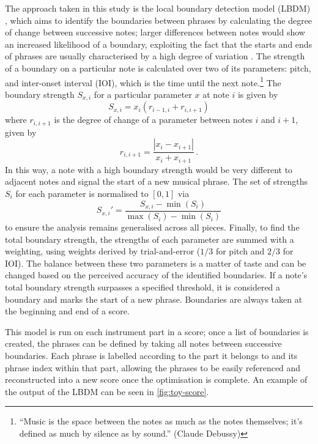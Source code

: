 \documentclass[12pt]{article}
\theoremstyle{definition}
\begin{document}
The approach taken in this study is the local boundary detection model (LBDM) \cite{cambouropoulos_lbdm_2011}, which aims to identify the boundaries between phrases by calculating the degree of change between successive notes; larger differences between notes would show an increased likelihood of a boundary, exploiting the fact that the starts and ends of phrases are usually characterised by a high degree of variation \cite{cambouropoulos_lbdm_2011}. The strength of a boundary on a particular note is calculated over two of its parameters: pitch, and inter-onset interval (IOI), which is the time until the next note.\footnote{``Music is the space between the notes as much as the notes themselves; it's defined as much by silence as by sound.'' (Claude Debussy)} The boundary strength $S_{x,i}$ for a particular parameter $x$ at note $i$ is given by
\begin{equation}
    S_{x,i}=x_i(r_{i-1, i} + r_{i, i+1})
    \label{eq:boundary-strength}
\end{equation}
where $r_{i, i+1}$ is the degree of change of a parameter between notes $i$ and $i+1$, given by
\begin{equation}
    r_{i, i+1}=\frac{|x_{i}-x_{i+1}|}{x_{i}+x_{i+1}} \,.
    \label{eq:degree-change}
\end{equation}
In this way, a note with a high boundary strength would be very different to adjacent notes and signal the start of a new musical phrase. The set of strengths $S_i$ for each parameter is normalised to $[0,1]$ via
\begin{equation}
    S_{x,i}'=\frac{S_{x,i}-\min(S_i)}{\max(S_i)-\min(S_i)}
    \label{eq:normalisation}
\end{equation}
to ensure the analysis remains generalised across all pieces.
Finally, to find the total boundary strength, the strengths of each parameter are summed with a weighting, using weights derived by trial-and-error ($1/3$ for pitch and $2/3$ for IOI). The balance between these two parameters is a matter of taste and can be changed based on the perceived accuracy of the identified boundaries. If a note's total boundary strength surpasses a specified threshold, it is considered a boundary and marks the start of a new phrase. Boundaries are always taken at the beginning and end of a score.

This model is run on each instrument part in a score; once a list of boundaries is created, the phrases can be defined by taking all notes between successive boundaries. Each phrase is labelled according to the part it belongs to and its phrase index within that part, allowing the phrases to be easily referenced and reconstructed into a new score once the optimisation is complete. An example of the output of the LBDM can be seen in \cref{fig:toy-score}.
\end{document}
